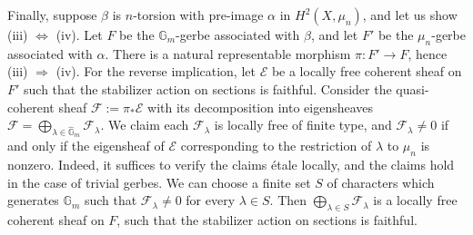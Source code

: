\documentclass[12pt]{amsart}
\newcommand{\G}{{\mathbb G}}
\newcommand{\cE}{{\mathcal E}}
\newcommand{\cF}{{\mathcal F}}
\theoremstyle{plain}
\theoremstyle{definition}
\theoremstyle{remark}
\begin{document}
Finally, suppose $\beta$ is $n$-torsion with pre-image
$\alpha$ in $H^2(X,\mu_n)$, and let us show
(iii) $\Leftrightarrow$ (iv).
Let $F$ be the $\G_m$-gerbe associated with $\beta$,
and let $F'$ be the $\mu_n$-gerbe associated with $\alpha$.
There is a natural representable morphism $\pi\colon F'\to F$,
hence (iii) $\Rightarrow$ (iv).
For the reverse implication, let $\cE$ be a locally free coherent
sheaf on $F'$ such that the stabilizer action on sections is faithful.
Consider the quasi-coherent sheaf $\cF:=\pi_*\cE$ with its decomposition
into eigensheaves $\cF=\bigoplus_{\lambda\in\widehat\G_m}\cF_\lambda$.
We claim each $\cF_\lambda$ is locally free of finite type, and
$\cF_\lambda\ne 0$
if and only if the eigensheaf of $\cE$ corresponding to
the restriction of $\lambda$ to $\mu_n$ is nonzero.
Indeed, it suffices to verify the claims \'etale locally,
and the claims hold in the case of trivial gerbes.
We can choose a finite set $S$ of characters which generates $\G_m$ such that
$\cF_\lambda\ne 0$ for every $\lambda\in S$.
Then $\bigoplus_{\lambda\in S}\cF_{\lambda}$ is
a locally free coherent sheaf on $F$,
such that the stabilizer action on sections is faithful.
\end{document}
